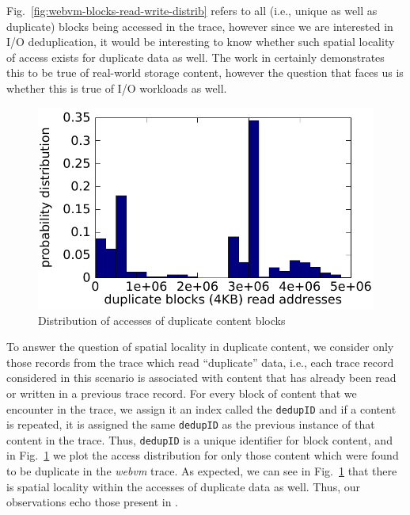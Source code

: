 Fig.~\ref{fig:webvm-blocks-read-write-distrib} refers to all (i.e., unique as well as
duplicate) blocks
being accessed in the trace, however since we are interested in I/O
deduplication, it would be interesting to know whether such spatial 
locality of access exists for duplicate data as well. The work in
\cite{idedup} certainly demonstrates this to be true of real-world storage content,
however the question that faces us is whether this is true of I/O workloads 
as well.
\begin{figure}
	\centering
	\includegraphics[scale=0.6]{tracechar-figures/21-day/webvm-dedup-block-read-appended-21-prob.pdf}
	\caption{Distribution of accesses of duplicate content blocks}
	\label{fig:webvm-blocks-dedup-distrib}
\end{figure}


To answer the question of spatial locality in duplicate content, we 
consider only those records from the trace which read ``duplicate''
data, i.e., each trace record considered in this scenario is associated
with content that has already been read or written in a previous trace
record. For every block of content that we encounter in the trace, we
assign it an index called the \texttt{dedupID} and if a content is
repeated, it is assigned the same \texttt{dedupID} as the previous
instance of that content in the trace. Thus, \texttt{dedupID} is a
unique identifier for block content, and in 
Fig.~\ref{fig:webvm-blocks-dedup-distrib}
we plot the access distribution for only those content which were 
found to be duplicate in the \textit{webvm} trace.
As expected, we can see in Fig.~\ref{fig:webvm-blocks-dedup-distrib}
that there is spatial locality within the accesses
of duplicate data as well. 
Thus, our observations echo those present in \cite{idedup}.

